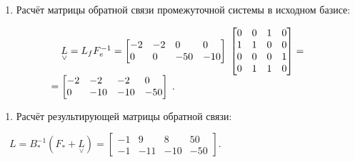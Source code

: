 \documentclass[a4paper]{article}
\newcounter{saveenum}
\newcommand\liststyleWWviiiNumlxvii{%
\renewcommand\theenumi{\arabic{enumi}}
\renewcommand\theenumii{\alph{enumii}}
\renewcommand\theenumiii{\roman{enumiii}}
\renewcommand\theenumiv{\arabic{enumiv}}
\renewcommand\labelenumi{\theenumi.}
\renewcommand\labelenumii{\theenumii.}
\renewcommand\labelenumiii{\theenumiii.}
\renewcommand\labelenumiv{\theenumiv.}
}
\begin{document}
\liststyleWWviiiNumlxvii
\begin{enumerate}
\item {\begin{russian}\sffamily
Расчёт матрицы обратной связи промежуточной системы в исходном базисе:
\end{russian}}
\end{enumerate}
\begin{equation*}
\begin{matrix}\ \ \ \underset{\vee }{L}=L_fF_e^{-1}=\left[\begin{matrix}-2\hfill\null &-2\hfill\null &0\hfill\null
&0\hfill\null \\0\hfill\null &0\hfill\null &-50\hfill\null &-10\hfill\null
\end{matrix}\right]\;\left[\begin{matrix}0\hfill\null &0\hfill\null &1\hfill\null &0\hfill\null \\1\hfill\null
&1\hfill\null &0\hfill\null &0\hfill\null \\0\hfill\null &0\hfill\null &0\hfill\null &1\hfill\null \\0\hfill\null
&1\hfill\null &1\hfill\null &0\hfill\null \end{matrix}\right]=\hfill\null \\=\left[\begin{matrix}-2\hfill\null
&-2\hfill\null &-2\hfill\null &0\hfill\null \\0\hfill\null &-10\hfill\null &-10\hfill\null &-50\hfill\null
\end{matrix}\right]\;.\hfill\null \end{matrix}\hfill 
\end{equation*}
\liststyleWWviiiNumlxvii
\setcounter{saveenum}{\value{enumi}}
\begin{enumerate}
\setcounter{enumi}{\value{saveenum}}
\item {\begin{russian}\sffamily
Расчёт результирующей матрицы обратной связи:
\end{russian}}
\end{enumerate}
{\begin{russian}\sffamily
\ \  $L=B_{\ast }^{-1}(F_{\ast }+\underset{\vee }{L})=\left[\begin{matrix}-1&9&8&50\\-1&-11&-10&-50\end{matrix}\right]$.
\end{russian}}
\end{document}
